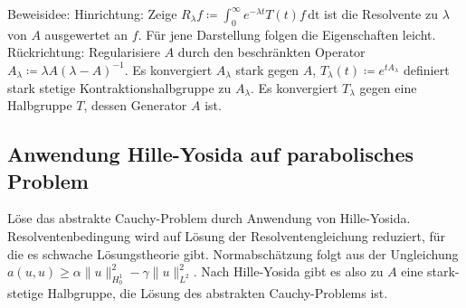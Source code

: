 \documentclass[11pt,a4paper]{scrartcl}
\theoremstyle{plain}
\theoremstyle{definition}
\theoremstyle{remark}
\begin{document}
Beweisidee: Hinrichtung: Zeige $R_\lambda f\coloneqq \int_{0}^{\infty} e^{-\lambda t}T(t)f \, \mathrm{dt}$ ist die Resolvente zu $\lambda$ von $A$ ausgewertet an $f$. Für jene Darstellung folgen die Eigenschaften leicht. Rückrichtung: Regularisiere $A$ durch den beschränkten Operator $A_\lambda \coloneqq \lambda A (\lambda-A)^{-1}$. Es konvergiert $A_\lambda$ stark gegen $A$, $T_\lambda(t) \coloneqq e^{tA_\lambda}$ definiert stark stetige Kontraktionshalbgruppe zu $A_\lambda$. Es konvergiert $T_\lambda$ gegen eine Halbgruppe $T$, dessen Generator $A$ ist.

\subsection{Anwendung Hille-Yosida auf parabolisches Problem}

Löse das abstrakte Cauchy-Problem durch Anwendung von Hille-Yosida. Resolventenbedingung wird auf Lösung der Resolventengleichung reduziert, für die es schwache Lösungstheorie gibt. Normabschätzung folgt aus der Ungleichung $a(u,u) \geq \alpha \|u\|_{H^1_0}^2 - \gamma \|u\|_{L^2}^2$. Nach Hille-Yosida gibt es also zu $A$ eine stark-stetige Halbgruppe, die Lösung des abstrakten Cauchy-Problems ist.
\end{document}

